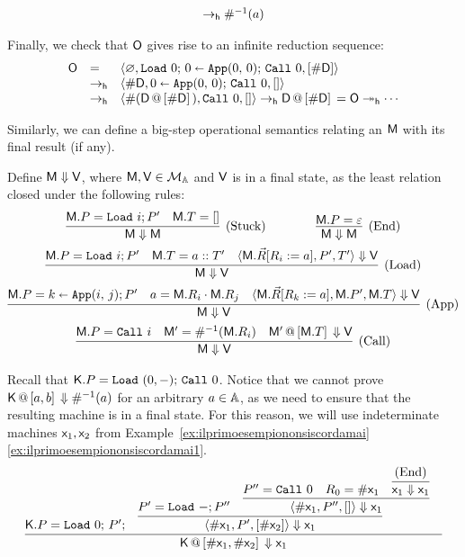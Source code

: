 \begin{exas}
\[\begin{array}{lll}
	\to_{\mathsf{h}}\#^{-1}(a)\\
	\end{array}
\]
\item Finally, we check that $\mathsf{O}$ gives rise to an infinite reduction sequence:
\[
	\begin{array}{lll}
	\mathsf{O} &=& \langle \varnothing,\mathtt{Load}~0;\,0\shortleftarrow \mathtt{App}(0,\,0);\,\mathtt{Call}~0,[\#\mathsf{D}]\rangle\\
	&\to_{\mathsf{h}}&\langle \#\mathsf{D},0\shortleftarrow \mathtt{App}(0,\,0);\,\mathtt{Call}~0,[]\rangle\\
	&\to_{\mathsf{h}}&\langle \#(\mathsf{D}\,@\,{[}\#\mathsf{D}{]}\,),\mathtt{Call}~0,[]\rangle\to_{\mathsf{h}} \mathsf{D}\,@\,{[}\#\mathsf{D}{]}\,
	= \mathsf{O}\twoheadrightarrow_{\mathsf{h}}\cdots\\
	\end{array}
\]
\esub
\end{exas}

\noindent
Similarly, we can define a big-step operational semantics relating an \am{} $\mathsf M$ with its final result (if any).

\begin{defi}
Define $\mathsf M \Downarrow \mathsf{V}$, where $\mathsf M,\mathsf V\in\mathcal{M}_{\mathbb{A}}$ and $\mathsf V$ is in a final state, as the least relation closed under the following rules:
\begin{gather*}
	\infer[(\textrm{Stuck})]{\mM \goesto \mM}{
		\mM.P = \RaS i;P'
		&
		\mM.T = []
		}
	\qquad\qquad
	\infer[(\textrm{End})]{\mM \goesto \mM}{
		\mM.P = \varepsilon
		}\\
		\infer[(\textrm{Load})]{\mM \goesto \mV}{
		\mM.P = \RaS i;P'
		&
		\mM.T = \Cons a{T'}
		&
		\tuple{\mM.\vec R\repl{R_i}{a},P',T'}\goesto \mV
		}
		\\
		\infer[(\textrm{App})]{
		\mM\goesto\mV}{\mM.P = \Apply i j k; P'
		&
		a = \App{\mM.R_i}{\mM.R_j}
		&
		\tuple{\mM.\vec R\repl{R_k}{a},\mM.P',\mM.T}\goesto\mV
	}
	\\
		\infer[(\textrm{Call})]{\mM\goesto \mV}{
			\mM.P = \Call i
			&
			\mM' = \Lookup^{-1}(\mM.R_i)
			&
			\append{\mM'}{\mM.T}\goesto \mV
	}
\end{gather*}

\begin{exa} Recall that $\mathsf K.P = \mathtt{Load}~(0,-);\,\mathtt{Call}~0$. Notice that we cannot prove $\mathsf K\,@\,{[}a,b{]}\,\Downarrow \#^{-1}(a)$ for an arbitrary $a\in\mathbb{A}$, as we need to ensure that the resulting machine is in a final state.
For this reason, we will use indeterminate machines $\mathsf{x}_1,\mathsf{x}_2$ from Example~\ref{ex:ilprimoesempiononsiscordamai}\ref{ex:ilprimoesempiononsiscordamai1}.
\[
	\infer{\append{\mK}{\Lookup \mach{x}_1,\Lookup \mach{x}_2}\goesto \mach{x}_1}{
	\mK.P = \Load 0;\,P';
	&
	\infer{\tuple{\Lookup\mach{x}_1,P',[\Lookup\mach{x}_2]}\goesto \mach{x}_1}{
		P'= \Load -;P'' &
		\infer{\tuple{\Lookup\mach{x}_1,P'',[]}\goesto \mach{x}_1}{
				P''=\Call 0
				&
				R_0 = \Lookup\mach{x}_1
				&
				\infer{\mach{x}_1\goesto \mach{x}_1}{\textrm{(End)}}
		}
	}
	&
	}
\]
\end{exa}
\end{defi}

